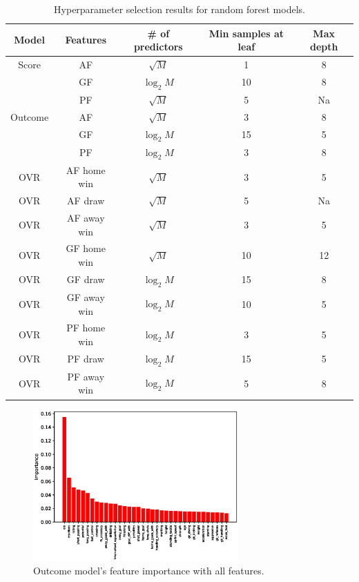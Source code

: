 \begin{table}
    \caption{Hyperparameter selection results for random forest models.}
    \begin{tabular}{| c  c| c| c| c|}
        \hline
        Model & Features & \# of predictors & Min samples at leaf & Max depth\\
        \hline
        Score & AF & $\sqrt{M}$ & 1 & 8 \\
         & GF & $\log_2{M}$ & 10 & 8 \\
         & PF & $\sqrt{M}$ & 5 & Na \\
         \hline
        Outcome & AF & $\sqrt{M}$ & 3 & 8 \\
         & GF & $\log_2{M}$ & 15 & 5 \\
         & PF & $\log_2{M}$ & 3 & 8 \\
        \hline
        OVR & AF home win & $\sqrt{M}$ & 3 & 5 \\
        OVR & AF draw & $\sqrt{M}$ & 5 & Na \\
        OVR & AF away win & $\sqrt{M}$ & 3 & 5 \\
        OVR & GF home win & $\sqrt{M}$ & 10 & 12 \\
        OVR & GF draw & $\log_2{M}$ & 15 & 8 \\
        OVR & GF away win & $\log_2{M}$ & 10 & 5 \\
        OVR & PF home win & $\log_2{M}$ & 3 & 5 \\
        OVR & PF draw & $\log_2{M}$ & 15 & 5 \\
        OVR & PF away win & $\log_2{M}$ & 5 & 8 \\
        \hline
    \end{tabular}
    \label{table:hyperparam_results}
\end{table}

\begin{figure}[H]
    \centering
    \includegraphics[width=0.7\textwidth]{img/match_level_2018_outcome_feature_importance_af_feature_importance.eps}
    \caption{Outcome model's feature importance with all features.}
    \label{fig:outcome_feature_importance_af}
\end{figure}

